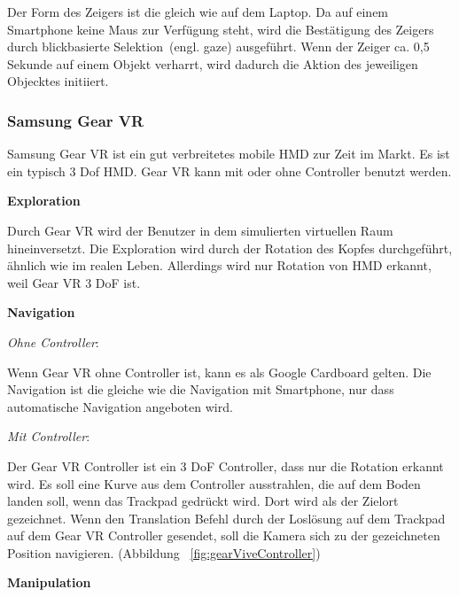   \noindent
  Der Form des Zeigers ist die gleich wie auf dem Laptop. Da auf einem Smartphone keine Maus zur Verfügung steht, wird die Bestätigung des Zeigers durch \glqq blickbasierte Selektion\grqq\ (engl. gaze) ausgeführt. Wenn der Zeiger ca. 0,5 Sekunde auf einem Objekt verharrt, wird dadurch die Aktion des jeweiligen Objecktes initiiert.
  
 \subsubsection{Samsung Gear VR}
 Samsung Gear VR ist ein gut verbreitetes mobile HMD zur Zeit im Markt. Es ist ein typisch 3 Dof HMD. Gear VR kann mit oder ohne Controller benutzt werden.
 
  \vspace{1em}
  \noindent
  \textbf{Exploration}
  \vspace{1em}
  
  \noindent
  Durch Gear VR wird der Benutzer in dem simulierten virtuellen Raum hineinversetzt. Die Exploration wird durch der Rotation des Kopfes durchgeführt, ähnlich wie im realen Leben. Allerdings wird nur Rotation von HMD erkannt, weil Gear VR 3 DoF ist.
  
  \vspace{1em}
  \noindent
  \textbf{Navigation}
  \vspace{1em}
  
  \noindent
  \textsl{Ohne Controller}:
  \vspace{0.5em}
  
  \noindent
  Wenn Gear VR ohne Controller ist, kann es als Google Cardboard gelten. Die Navigation ist die gleiche wie die Navigation mit Smartphone, nur dass automatische Navigation angeboten wird.
 
  \vspace{0.5em}
  \noindent
  \textsl{Mit Controller}:
  \vspace{0.5em}
  
  \noindent
  Der Gear VR Controller ist ein 3 DoF Controller, dass nur die Rotation erkannt wird. Es soll eine Kurve aus dem Controller ausstrahlen, die auf dem Boden landen soll, wenn das Trackpad gedrückt wird. Dort wird als der Zielort gezeichnet. Wenn den Translation Befehl durch der Loslösung auf dem Trackpad auf dem Gear VR Controller gesendet, soll die Kamera sich zu der gezeichneten Position navigieren. (Abbildung ~\ref{fig:gearViveController})

  \vspace{1em}
  \noindent
  \textbf{Manipulation}
  \vspace{1em}
  
